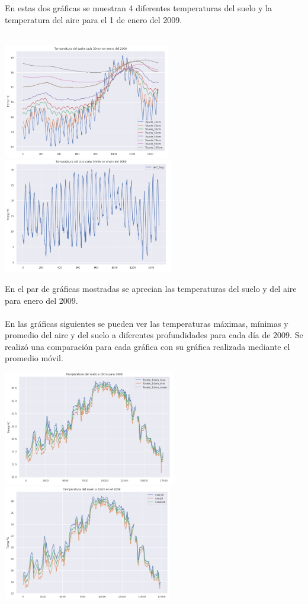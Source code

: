\documentclass[letterpaper,12pt]{article}
\begin{document}
En estas dos gráficas se muestran 4 diferentes temperaturas del suelo y la temperatura del aire para el 1 de enero del 2009. 
\\
\\
\begin{center}
	\includegraphics[height=5cm]{T30SueloEnero.png}\hspace*{\fill}
	\label{graf3}
   \includegraphics[height=5cm]{T30AireEnero.png}
    \label{graf4}
\end{center}

En el par de gráficas mostradas se aprecian las temperaturas del suelo y del aire para enero del 2009.
\\
\\
En las gráficas siguientes se pueden ver las temperaturas máximas, mínimas y promedio del aire y del suelo a diferentes profundidades para cada día de 2009. Se realizó una comparación para cada gráfica con su gráfica realizada mediante el promedio móvil.

\begin{center}
	\includegraphics[height=5cm]{T10.png}\hspace*{\fill}
	\label{graf5}
   \includegraphics[height=5cm]{T10roll.png}
    \label{graf6}
\end{center}
\end{document}
